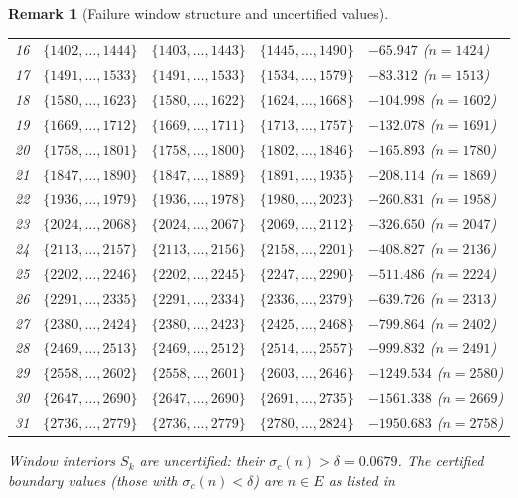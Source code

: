 \documentclass[11pt]{article}
\newtheorem{remark}[theorem]{Remark}
\begin{document}
\begin{remark}[Failure window structure and uncertified values]
\begin{center}
\begin{tabular}{rlccl}
16 & $\{1402,\ldots,1444\}$ & $\{1403,\ldots,1443\}$ & $\{1445,\ldots,1490\}$ & $-65.947$ ($n=1424$) \\
17 & $\{1491,\ldots,1533\}$ & $\{1491,\ldots,1533\}$ & $\{1534,\ldots,1579\}$ & $-83.312$ ($n=1513$) \\
18 & $\{1580,\ldots,1623\}$ & $\{1580,\ldots,1622\}$ & $\{1624,\ldots,1668\}$ & $-104.998$ ($n=1602$) \\
19 & $\{1669,\ldots,1712\}$ & $\{1669,\ldots,1711\}$ & $\{1713,\ldots,1757\}$ & $-132.078$ ($n=1691$) \\
20 & $\{1758,\ldots,1801\}$ & $\{1758,\ldots,1800\}$ & $\{1802,\ldots,1846\}$ & $-165.893$ ($n=1780$) \\
21 & $\{1847,\ldots,1890\}$ & $\{1847,\ldots,1889\}$ & $\{1891,\ldots,1935\}$ & $-208.114$ ($n=1869$) \\
22 & $\{1936,\ldots,1979\}$ & $\{1936,\ldots,1978\}$ & $\{1980,\ldots,2023\}$ & $-260.831$ ($n=1958$) \\
23 & $\{2024,\ldots,2068\}$ & $\{2024,\ldots,2067\}$ & $\{2069,\ldots,2112\}$ & $-326.650$ ($n=2047$) \\
24 & $\{2113,\ldots,2157\}$ & $\{2113,\ldots,2156\}$ & $\{2158,\ldots,2201\}$ & $-408.827$ ($n=2136$) \\
25 & $\{2202,\ldots,2246\}$ & $\{2202,\ldots,2245\}$ & $\{2247,\ldots,2290\}$ & $-511.486$ ($n=2224$) \\
26 & $\{2291,\ldots,2335\}$ & $\{2291,\ldots,2334\}$ & $\{2336,\ldots,2379\}$ & $-639.726$ ($n=2313$) \\
27 & $\{2380,\ldots,2424\}$ & $\{2380,\ldots,2423\}$ & $\{2425,\ldots,2468\}$ & $-799.864$ ($n=2402$) \\
28 & $\{2469,\ldots,2513\}$ & $\{2469,\ldots,2512\}$ & $\{2514,\ldots,2557\}$ & $-999.832$ ($n=2491$) \\
29 & $\{2558,\ldots,2602\}$ & $\{2558,\ldots,2601\}$ & $\{2603,\ldots,2646\}$ & $-1249.534$ ($n=2580$) \\
30 & $\{2647,\ldots,2690\}$ & $\{2647,\ldots,2690\}$ & $\{2691,\ldots,2735\}$ & $-1561.338$ ($n=2669$) \\
31 & $\{2736,\ldots,2779\}$ & $\{2736,\ldots,2779\}$ & $\{2780,\ldots,2824\}$ & $-1950.683$ ($n=2758$) \\
\bottomrule
\end{tabular}
\end{center}
Window interiors $S_k$ are uncertified: their $\sigma_c(n) > \delta = 0.0679$.
The certified boundary values (those with $\sigma_c(n) < \delta$) are $n \in E$ as listed in

\end{remark}
\end{document}
